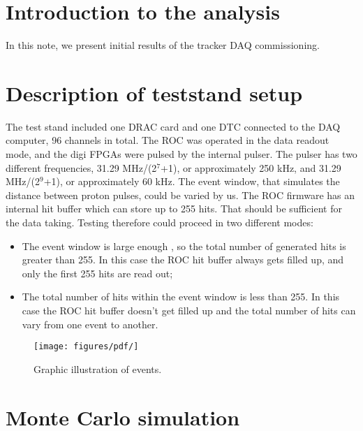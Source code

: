 \section {Introduction to the analysis}

In this note, we present initial results of the tracker DAQ commissioning.
\section{Description of teststand setup}
  The test stand included one DRAC card and one DTC connected to the DAQ computer,
  96 channels in total.
  The ROC was operated in the data readout mode, and the digi FPGAs were pulsed by the internal pulser.
  The pulser has two different frequencies,  31.29 MHz/(2$^7$+1), or approximately 250 kHz,
  and 31.29 MHz/(2$^9$+1), or approximately 60 kHz.
  The event window, that simulates the distance between proton pulses, could be varied by us.
  The ROC firmware has an internal hit buffer which can store up to 255 hits.
  That should be sufficient for the data taking.
  Testing therefore could proceed in two different modes:
  \begin{itemize}
  \item
    The event window is large enough , so the total number of generated hits is greater than 255. In this case
    the ROC hit buffer always gets filled up, and only the first 255 hits are read out;
  \item
    The total number of hits within the event window is less than 255.
    In this case the ROC hit buffer doesn't get filled up and the total number of hits
    can vary from one event to another.
  \end{itemize}

\begin{figure}[!h]
\centering
\texttt{[image: figures/pdf/]}
\caption{Graphic illustration of events.}
\label{fig:3}
\end{figure}
\section{Monte Carlo simulation}\label{MonteCarlo}

